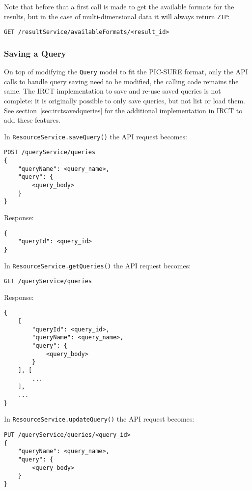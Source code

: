 Note that before that a first call is made to get the available formats for the results, but in the case of multi-dimensional data it will always return \verb|ZIP|:
\begin{verbatim}
GET /resultService/availableFormats/<result_id>
\end{verbatim}




\subsubsection{Saving a Query}
On top of modifying the \verb|Query| model to fit the PIC-SURE format, only the API calls to handle query saving need to be modified, the calling code remains the same.
The IRCT implementation to save and re-use saved queries is not complete: it is originally possible to only save queries, but not list or load them. 
See section~\ref{sec:irctsavedqueries} for the additional implementation in IRCT to add these features.

In \verb|ResourceService.saveQuery()| the API request becomes:
\begin{verbatim}
POST /queryService/queries
{
    "queryName": <query_name>,
    "query": {
        <query_body>
    }
}    
\end{verbatim}

Response:
\begin{verbatim}
{
    "queryId": <query_id>
}    
\end{verbatim}

In  \verb|ResourceService.getQueries()| the API request becomes:
\begin{verbatim}
GET /queryService/queries
\end{verbatim}

Response:
\begin{verbatim}
{
    [
        "queryId": <query_id>,
        "queryName": <query_name>,
        "query": {
            <query_body>
        }
    ], [
        ...
    ],
    ...
}    
\end{verbatim}

In  \verb|ResourceService.updateQuery()| the API request becomes:
\begin{verbatim}
PUT /queryService/queries/<query_id>
{
    "queryName": <query_name>,
    "query": {
        <query_body>
    }
}
\end{verbatim}

